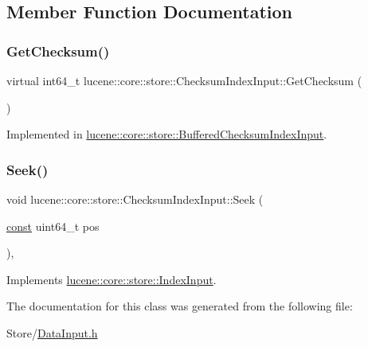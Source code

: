 \subsection{Member Function Documentation}
\mbox{\label{classlucene_1_1core_1_1store_1_1ChecksumIndexInput_a3e435a226c121e1467727d51ad2f6d65}} 
\subsubsection{\texorpdfstring{Get\+Checksum()}{GetChecksum()}}
{\footnotesize\ttfamily virtual int64\+\_\+t lucene\+::core\+::store\+::\+Checksum\+Index\+Input\+::\+Get\+Checksum (\begin{DoxyParamCaption}{ }\end{DoxyParamCaption})\hspace{0.3cm}{\ttfamily [pure virtual]}}



Implemented in \mbox{\hyperlink{classlucene_1_1core_1_1store_1_1BufferedChecksumIndexInput_a00eeaf29512d43fa7757be71e10ca4d5}{lucene\+::core\+::store\+::\+Buffered\+Checksum\+Index\+Input}}.

\mbox{\label{classlucene_1_1core_1_1store_1_1ChecksumIndexInput_a6e16713a71125b9ee2d1407cf2d6c6fb}} 
\subsubsection{\texorpdfstring{Seek()}{Seek()}}
{\footnotesize\ttfamily void lucene\+::core\+::store\+::\+Checksum\+Index\+Input\+::\+Seek (\begin{DoxyParamCaption}\item[{\mbox{\hyperlink{ZlibCrc32_8h_a2c212835823e3c54a8ab6d95c652660e}{const}} uint64\+\_\+t}]{pos }\end{DoxyParamCaption})\hspace{0.3cm}{\ttfamily [inline]}, {\ttfamily [virtual]}}



Implements \mbox{\hyperlink{classlucene_1_1core_1_1store_1_1IndexInput_ad0eecec90fbbcfe46f881d75105a6046}{lucene\+::core\+::store\+::\+Index\+Input}}.



The documentation for this class was generated from the following file\+:\begin{DoxyCompactItemize}
\item 
Store/\mbox{\hyperlink{DataInput_8h}{Data\+Input.\+h}}\end{DoxyCompactItemize}
